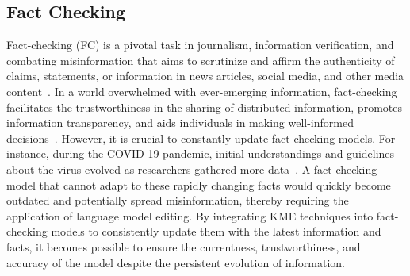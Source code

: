 \documentclass[acmsmall, screen]{acmart}
\begin{document}
\subsection{Fact Checking}

 Fact-checking (FC) is a pivotal task in journalism, information verification, and combating misinformation that aims to scrutinize and affirm the authenticity of claims, statements, or information in news articles, social media, and other media content~\cite{schuster2021get,galitsky2023truth}. In a world overwhelmed with ever-emerging information, fact-checking facilitates the trustworthiness in the sharing of distributed information, promotes information transparency, and aids individuals in making well-informed decisions~\cite{thorne-etal-2018-fever}. However, it is crucial to constantly update fact-checking models.
For instance, during the COVID-19 pandemic, initial understandings and guidelines about the virus evolved as researchers gathered more data~\cite{shahi2021exploratory}. A fact-checking model that cannot adapt to these rapidly changing facts would quickly become outdated and potentially spread misinformation, thereby requiring the application of language model editing.
By integrating KME techniques into fact-checking models to consistently update them with the latest information and facts, it becomes possible to ensure the currentness, trustworthiness, and accuracy of the model despite the persistent evolution of information.

\end{document}
